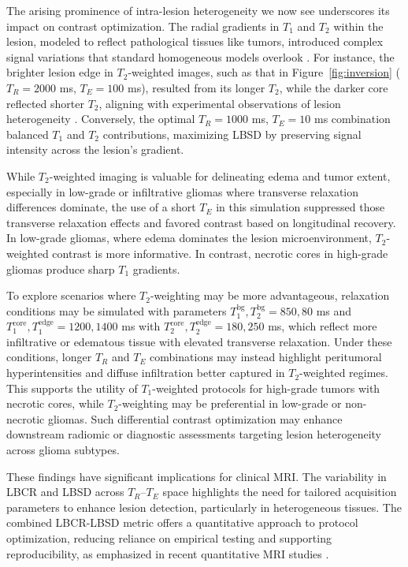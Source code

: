 \documentclass[10pt,a4paper,twoside]{article}
\begin{document}
The arising prominence of intra-lesion heterogeneity we now see underscores its impact on contrast optimization. The radial gradients in $T_1$ and $T_2$ within the lesion, modeled to reflect pathological tissues like tumors, introduced complex signal variations that standard homogeneous models overlook \cite{does2002, xu2009}. For instance, the brighter lesion edge in $T_2$-weighted images, such as that in Figure~\ref{fig:inversion} ($T_R = 2000$ ms, $T_E = 100$ ms), resulted from its longer $T_2$, while the darker core reflected shorter $T_2$, aligning with experimental observations of lesion heterogeneity \cite{tofts2003}. Conversely, the optimal $T_R = 1000$ ms, $T_E = 10$ ms combination balanced $T_1$ and $T_2$ contributions, maximizing LBSD by preserving signal intensity across the lesion’s gradient.

While $T_2$-weighted imaging is valuable for delineating edema and tumor extent, especially in low-grade or infiltrative gliomas where transverse relaxation differences dominate, the use of a short $T_E$ in this simulation suppressed those transverse relaxation effects and favored contrast based on longitudinal recovery. In low-grade gliomas, where edema dominates the lesion microenvironment, $T_2$-weighted contrast is more informative. In contrast, necrotic cores in high-grade gliomas produce sharp $T_1$ gradients. 

To explore scenarios where $T_2$-weighting may be more advantageous, relaxation conditions may be simulated with parameters $T_1^{\text{bg}}, T_2^{\text{bg}} = 850, 80$ ms and $T_1^{\text{core}}, T_1^{\text{edge}} = 1200, 1400$ ms with $T_2^{\text{core}}, T_2^{\text{edge}} = 180, 250$ ms, which reflect more infiltrative or edematous tissue with elevated transverse relaxation. Under these conditions, longer $T_R$ and $T_E$ combinations may instead highlight peritumoral hyperintensities and diffuse infiltration better captured in $T_2$-weighted regimes. This supports the utility of $T_1$-weighted protocols for high-grade tumors with necrotic cores, while $T_2$-weighting may be preferential in low-grade or non-necrotic gliomas. Such differential contrast optimization may enhance downstream radiomic or diagnostic assessments targeting lesion heterogeneity across glioma subtypes.

These findings have significant implications for clinical MRI. The variability in LBCR and LBSD across $T_R$–$T_E$ space highlights the need for tailored acquisition parameters to enhance lesion detection, particularly in heterogeneous tissues. The combined LBCR-LBSD metric offers a quantitative approach to protocol optimization, reducing reliance on empirical testing and supporting reproducibility, as emphasized in recent quantitative MRI studies \cite{stikov2015, naganawa2002}.
\end{document}
